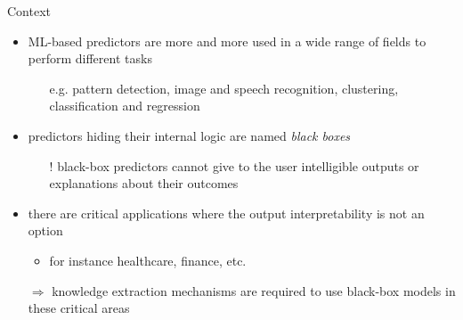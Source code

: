 \documentclass[presentation]{beamer}
\begin{document}
\begin{frame}[c]{Context}
    
    \vfill
    \begin{itemize}
        \item ML-based predictors are more and more used in a wide range of fields to perform different tasks
        \begin{itemize}
            \item[e.g.] pattern detection, image and speech recognition, clustering, classification and regression
        \end{itemize}
        
        \vfill
        
        \item predictors hiding their internal logic are named \emph{black boxes}
        \begin{itemize}
            \item[!] black-box predictors cannot give to the user intelligible outputs or \alert{explanations about their outcomes}
        \end{itemize}
        
        \vfill
        
        \item there are critical applications where the output interpretability is not an option
        \begin{itemize}
        	\item for instance healthcare, finance, etc.
        \end{itemize}
    
    	\vfill
        
        \item[$\Rightarrow$] knowledge extraction mechanisms are required to use black-box models in these critical areas 
        
    \end{itemize}
\end{frame}
\end{document}
